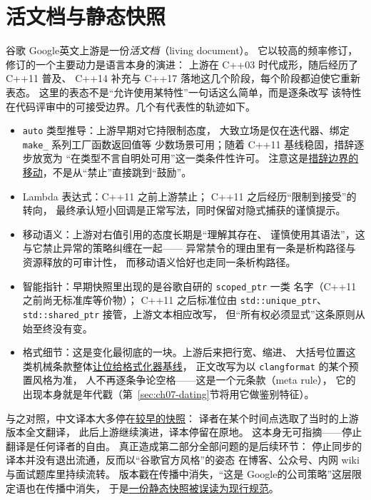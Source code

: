 \documentclass[12pt,a4paper,fontset=fandol]{ctexbook}
\newcommand{\cpp}[1]{C++#1}
\newcommand{\Tp}[1]{\texttt{#1}}
\newcommand{\Bk}{\discretionary{}{}{}}
\newcommand{\Lang}[1]{\textsf{#1}}
\newcommand{\DomGo}{\Lang{Google}}
\begin{document}
\section{活文档与静态快照}
\label{sec:ch07-upstream}

谷歌 \DomGo 英文上游是一份\emph{活文档}（living document）。
它以较高的频率修订，修订的一个主要动力是语言本身的演进：
上游在 \cpp{03} 时代成形，随后经历了 \cpp{11} 普及、
\cpp{14} 补充与 \cpp{17} 落地这几个阶段，每个阶段都迫使它重新表态。
这里的表态不是``允许使用某特性''一句话这么简单，而是逐条改写
该特性在代码评审中的可接受边界。几个有代表性的轨迹如下。

\begin{itemize}
  \item \Tp{auto} 类型推导：上游早期对它持限制态度，
        大致立场是仅在迭代器、绑定 \Tp{make\_} 系列工厂函数返回值等
        少数场景可用；随着 \cpp{11} 基线稳固，措辞逐步放宽为
        ``在类型不言自明处可用''这一类条件性许可。
        注意这是\underline{措辞边界的移动}，不是从``禁止''直接跳到``鼓励''。
  \item Lambda 表达式：\cpp{11} 之前上游禁止；
        \cpp{11} 之后经历``限制到接受''的转向，
        最终承认短小回调是正常写法，同时保留对隐式捕获的谨慎提示。
  \item 移动语义：上游对右值引用的态度长期是``理解其存在、
        谨慎使用其语法''，这与它禁止异常的策略纠缠在一起——
        异常禁令的理由里有一条是析构路径与资源释放的可审计性，
        而移动语义恰好也走同一条析构路径。
  \item 智能指针：早期快照里出现的是谷歌自研的 \Tp{scoped\_ptr} 一类
        名字（\cpp{11} 之前尚无标准库等价物）；
        \cpp{11} 之后标准位由 \Tp{std::unique\_ptr}、
        \Tp{std::shared\_ptr} 接管，上游文本相应改写，
        但``所有权必须显式''这条原则从始至终没有变。
  \item 格式细节：这是变化最彻底的一块。上游后来把行宽、缩进、
        大括号位置这类机械条款整体\underline{让位给格式化器基线}，
        正文改写为以 \Tp{clang{\Bk}format} 的某个预置风格为准，
        人不再逐条争论空格——这是一个元条款（meta rule），
        它的出现本身就是年代戳（第~\ref{sec:ch07-dating}节将用它做鉴别特征）。
\end{itemize}

与之对照，中文译本大多停在\underline{较早的快照}：
译者在某个时间点选取了当时的上游版本全文翻译，
此后上游继续演进，译本停留在原地。
这本身无可指摘——停止翻译是任何译者的自由。
真正造成第二部分全部问题的是后续环节：
停止同步的译本并没有退出流通，反而以``谷歌官方风格''的姿态
在博客、公众号、内网 wiki 与面试题库里持续流转。
版本戳在传播中消失，``这是 \DomGo 的公司策略''这层限定语也在传播中消失，
于是\underline{一份静态快照被误读为现行规范}。
\end{document}
